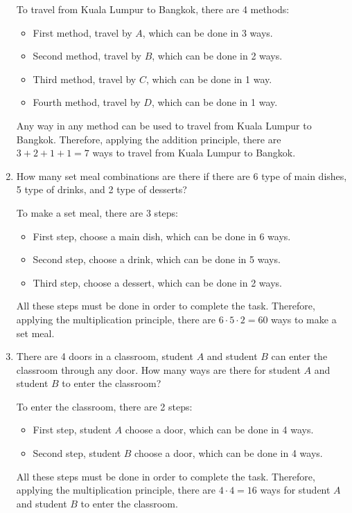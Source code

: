 \documentclass{report}
\begin{document}
\begin{multicols}{2}
\begin{enumerate}
          To travel from Kuala Lumpur to Bangkok, there are 4 methods:
          \begin{itemize}
            \item First method, travel by $A$, which can be done in 3 ways.
            \item Second method, travel by $B$, which can be done in 2 ways.
            \item Third method, travel by $C$, which can be done in 1 way.
            \item Fourth method, travel by $D$, which can be done in 1 way.
          \end{itemize}
          Any way in any method can be used to travel from Kuala Lumpur to Bangkok. Therefore, applying the addition principle, there are $3 + 2 + 1 + 1 = 7$ ways to travel from Kuala Lumpur to Bangkok.

    \item How many set meal combinations are there if there are 6 type of main dishes, 5
          type of drinks, and 2 type of desserts? \sol{}

          To make a set meal, there are 3 steps:
          \begin{itemize}
            \item First step, choose a main dish, which can be done in 6 ways.
            \item Second step, choose a drink, which can be done in 5 ways.
            \item Third step, choose a dessert, which can be done in 2 ways.
          \end{itemize}
          All these steps must be done in order to complete the task. Therefore, applying the multiplication principle, there are $6 \cdot 5 \cdot 2 = 60$ ways to make a set meal.

    \item There are 4 doors in a classroom, student $A$ and student $B$ can enter the
          classroom through any door. How many ways are there for student $A$ and student
          $B$ to enter the classroom? \sol{}

          To enter the classroom, there are 2 steps:
          \begin{itemize}
            \item First step, student $A$ choose a door, which can be done in 4 ways.
            \item Second step, student $B$ choose a door, which can be done in 4 ways.
          \end{itemize}
          All these steps must be done in order to complete the task. Therefore, applying the multiplication principle, there are $4 \cdot 4 = 16$ ways for student $A$ and student $B$ to enter the classroom.


\end{enumerate}
\end{multicols}
\end{document}
